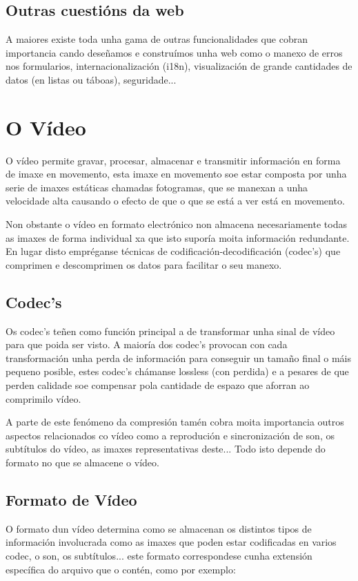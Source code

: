	\subsection{Outras cuestións da web}
		A maiores existe toda unha gama de outras funcionalidades que cobran importancia cando deseñamos
		e construímos unha web como o manexo de erros nos formularios, internacionalización (i18n), 
		visualización de grande cantidades de datos (en listas ou táboas), seguridade...
		
		
\section{O Vídeo}
    O vídeo permite gravar, procesar, almacenar e transmitir información en forma de 
    imaxe en movemento, esta imaxe en movemento soe estar composta por unha serie de imaxes 
    estáticas chamadas fotogramas, que se manexan a unha velocidade alta causando o efecto de que o
    que se está a ver está en movemento.
    
    Non obstante o vídeo en formato electrónico non almacena necesariamente todas as imaxes de forma
    individual xa que isto suporía moita información redundante. En lugar disto empréganse técnicas
    de codificación-decodificación (codec's) que comprimen e descomprimen os datos para facilitar o
    seu manexo.

    \subsection{Codec's}
        Os codec's teñen como función principal a de transformar unha sinal de vídeo para que poida
        ser visto. A maioría dos codec's provocan con cada transformación unha perda de información
        para conseguir un tamaño final o máis pequeno posible, estes codec's chámanse lossless (con 
        perdida) e a pesares de que perden calidade soe compensar pola cantidade de espazo que 
        aforran ao comprimilo vídeo.
        
        A parte de este fenómeno da compresión tamén cobra moita importancia outros aspectos 
        relacionados co vídeo como a reprodución e sincronización de son, os subtítulos do vídeo,
        as imaxes representativas deste... Todo isto depende do formato no que se almacene o vídeo.
        
    \subsection{Formato de Vídeo}
        O formato dun vídeo determina como se almacenan os distintos tipos de información involucrada
        como as imaxes que poden estar codificadas en varios codec, o son, os subtítulos...
        este formato correspondese cunha extensión específica do arquivo que o contén, como por 
        exemplo:
        
